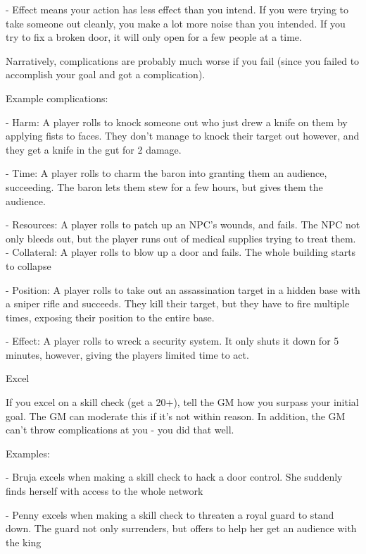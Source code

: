     -   Effect means your action has less effect than you intend. If you were trying to take  
         someone out cleanly, you make a lot more noise than you intended. If you try to fix a  
         broken door, it will only open for a few people at a time.
 

Narratively, complications are probably much worse if you fail (since you failed to accomplish  
your goal and got a complication).
 

Example complications:
 
         	- Harm: A player rolls to knock someone out who just drew a knife on them by applying  
         fists to faces. They don’t manage to knock their target out however, and they get a knife  
         in the gut for 2 damage.
 
         - Time: A player rolls to charm the baron into granting them an audience, succeeding.  
         The baron lets them stew for a few hours, but gives them the audience.
 
         	- Resources: A player rolls to patch up an NPC’s wounds, and fails. The NPC not only  
         bleeds out, but the player runs out of medical supplies trying to treat them.  
         - Collateral: A player rolls to blow up a door and fails. The whole building starts to  
         collapse
 
         	- Position: A player rolls to take out an assassination target in a hidden base with a  
         sniper rifle and succeeds. They kill their target, but they have to fire multiple times,  
         exposing their position to the entire base.
 
         	- Effect: A player rolls to wreck a security system. It only shuts it down for 5 minutes,  
         however, giving the players limited time to act.
 

                                                       Excel  

If you excel on a skill check (get a 20+), tell the GM how you surpass your initial goal. The GM  
can moderate this if it’s not within reason. In addition, the GM can’t throw complications at you -  
you did that well.
 

Examples:
 
         	- Bruja excels when making a skill check to hack a door control. She suddenly finds  
         herself with access to the whole network
 
         	- Penny excels when making a skill check to threaten a royal guard to stand down. The  
         guard not only surrenders, but offers to help her get an audience with the king
 

